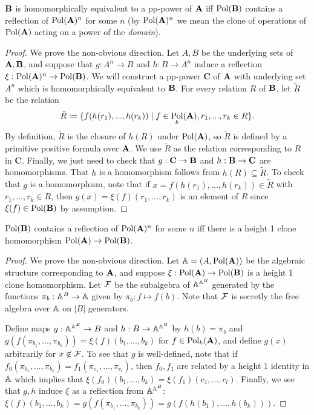 \documentclass[letterpaper,11pt]{article}
\DeclareMathOperator{\Pol}{Pol}
\begin{document}
\begin{prop}\label{erp-prop} $\mathbf{B}$ is homomorphically equivalent to a pp-power of $\mathbf{A}$ iff $\Pol(\fB)$ contains a reflection of $\Pol(\fA)^n$ for some $n$ (by $\Pol(\fA)^n$ we mean the clone of operations of $\Pol(\fA)$ acting on a power of the \emph{domain}).
\end{prop}
\begin{proof} We prove the non-obvious direction. Let $A,B$ be the underlying sets of $\mathbf{A}, \mathbf{B}$, and suppose that $g: A^n \rightarrow B$ and $h: B \rightarrow A^n$ induce a reflection $\xi : \Pol(\fA)^n \rightarrow \Pol(\fB)$. We will construct a pp-power $\mathbf{C}$ of $\mathbf{A}$ with underlying set $A^n$ which is homomorphically equivalent to $\mathbf{B}$. For every relation $R$ of $\mathbf{B}$, let $\tilde{R}$ be the relation
\[
\tilde{R} \coloneqq \{f(h(r_1), ..., h(r_k)) \mid f \in \Pol_k(\fA), r_1, ..., r_k \in R\}.
\]
By definition, $\tilde{R}$ is the closure of $h(R)$ under $\Pol(\fA)$, so $\tilde{R}$ is defined by a primitive positive formula over $\mathbf{A}$. We use $\tilde{R}$ as the relation corresponding to $R$ in $\mathbf{C}$. Finally, we just need to check that $g : \mathbf{C} \rightarrow \mathbf{B}$ and $h : \mathbf{B} \rightarrow \mathbf{C}$ are homomorphisms. That $h$ is a homomorphism follows from $h(R) \subseteq \tilde{R}$. To check that $g$ is a homomorphism, note that if $x = f(h(r_1), ..., h(r_k)) \in \tilde{R}$ with $r_1, ..., r_k \in R$, then $g(x) = \xi(f)(r_1, ..., r_k)$ is an element of $R$ since $\xi(f) \in \Pol(\fB)$ by assumption.
\end{proof}

\begin{thm}\label{erp-thm} $\Pol(\fB)$ contains a reflection of $\Pol(\fA)^n$ for some $n$ iff there is a height 1 clone homomorphism $\Pol(\fA) \rightarrow \Pol(\fB)$.
\end{thm}
\begin{proof} We prove the non-obvious direction. Let $\bA = (A,\Pol(\fA))$ be the algebraic structure corresponding to $\mathbf{A}$, and suppose $\xi : \Pol(\fA) \rightarrow \Pol(\fB)$ is a height 1 clone homomorphism. Let $\mathcal{F}$ be the subalgebra of $\mathbb{A}^{\mathbb{A}^B}$ generated by the functions $\pi_b : \mathbb{A}^B \rightarrow \mathbb{A}$ given by $\pi_b : f \mapsto f(b)$. Note that $\mathcal{F}$ is secretly the free algebra over $\mathbb{A}$ on $|B|$ generators.

Define maps $g : \mathbb{A}^{\mathbb{A}^B} \rightarrow B$ and $h : B \rightarrow \mathbb{A}^{\mathbb{A}^B}$ by $h(b) = \pi_b$ and $g(f(\pi_{b_1}, ..., \pi_{b_k})) = \xi(f)(b_1, ..., b_k)$ for $f \in \Pol_k(\fA)$, and define $g(x)$ arbitrarily for $x \not\in \mathcal{F}$. To see that $g$ is well-defined, note that if $f_0(\pi_{b_1}, ..., \pi_{b_k}) = f_1(\pi_{c_1}, ..., \pi_{c_l})$, then $f_0, f_1$ are related by a height 1 identity in $\mathbb{A}$ which implies that $\xi(f_0)(b_1, ..., b_k) = \xi(f_1)(c_1, ..., c_l)$. Finally, we see that $g,h$ induce $\xi$ as a reflection from $\mathbb{A}^{\mathbb{A}^B}$: $\xi(f)(b_1, ..., b_k) = g(f(\pi_{b_1}, ..., \pi_{b_k})) = g(f(h(b_1), ..., h(b_k)))$.
\end{proof}
\end{document}
